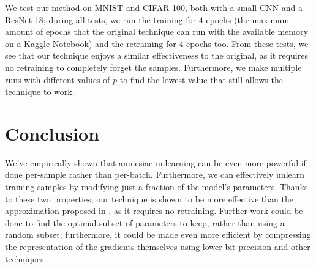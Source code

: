 \documentclass{article}
\begin{document}
We test our method on MNIST and CIFAR-100, both with a small CNN and a ResNet-18; during all tests, we run the training for $4$ epochs (the maximum amount of epochs that the original technique can run with the available memory on a Kaggle Notebook) and the retraining for $4$ epochs too. From these tests, we see that our technique enjoys a similar effectiveness to the original, as it requires no retraining to completely forget the samples. Furthermore, we make multiple runs with different values of $p$ to find the lowest value that still allows the technique to work.

\section{Conclusion}
We've empirically shown that amnesiac unlearning can be even more powerful if done per-sample rather than per-batch. Furthermore, we can effectively unlearn training samples by modifying just a fraction of the model's parameters. Thanks to these two properties, our technique is shown to be more effective than the approximation proposed in \cite{gogineni2024efficient}, as it requires no retraining. Further work could be done to find the optimal subset of parameters to keep, rather than using a random subset; furthermore, it could be made even more efficient by compressing the representation of the gradients themselves using lower bit precision and other techniques.



\end{document}
